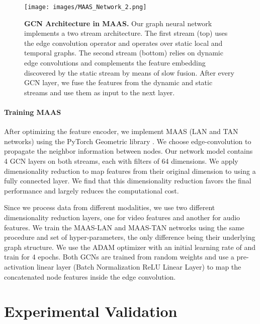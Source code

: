 \documentclass[10pt,twocolumn,letterpaper]{article}
\begin{document}
\begin{figure}[t]
    \begin{center}
        \texttt{[image: images/MAAS\_Network\_2.png]}
    \end{center}
    \caption{\textbf{GCN Architecture in MAAS.}
    Our graph neural network implements a two stream architecture. The first stream (top) uses the edge convolution operator and operates over static local and temporal graphs. The second stream (bottom) relies on dynamic edge convolutions and complements the feature embedding discovered by the static stream by means of slow fusion. After every GCN layer, we fuse the features from the dynamic and static streams and use them as input to the next layer.
    }
    \label{fig:ourgcn}
\end{figure}
 

\paragraph{Training MAAS}
After optimizing the feature encoder, we implement MAAS (LAN and TAN networks) using the PyTorch Geometric library \cite{Fey/Lenssen/2019}. We choose edge-convolution \cite{wang2019dynamic} to propagate the neighbor information between nodes. Our network model contains 4 GCN layers on both streams, each with filters of 64 dimensions. We apply dimensionality reduction to map features from their original  dimension to  using a fully connected layer. We find that this dimensionality reduction favors the final performance and largely reduces the computational cost.

Since we process data from different modalities, we use two different dimensionality reduction layers, one for video features and another for audio features.  We train the MAAS-LAN and MAAS-TAN networks using the same procedure and set of hyper-parameters, the only difference being their underlying graph structure. We use the ADAM optimizer with an initial learning rate of  and train for 4 epochs. Both GCNs are trained from random weights and use a pre-activation \cite{he2016identity} linear layer (Batch Normalization  ReLU  Linear Layer) to map the concatenated node features inside the edge convolution.



 \section{Experimental Validation}
\label{sec:results}
\end{document}

